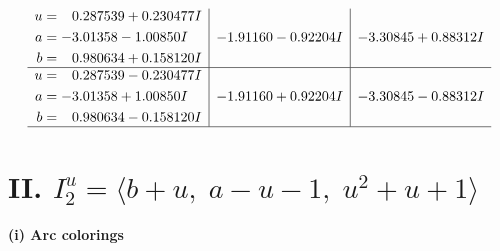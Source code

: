 \documentclass[1p]{elsarticle_modified}
\theoremstyle{definition}
\begin{document}
$$\begin{array}{c|c|c}
\begin{aligned}
u &= \phantom{-}0.287539 + 0.230477 I \\
a &= -3.01358 - 1.00850 I \\
b &= \phantom{-}0.980634 + 0.158120 I\end{aligned}
 & -1.91160 - 0.92204 I & -3.30845 + 0.88312 I \\ \hline\begin{aligned}
u &= \phantom{-}0.287539 - 0.230477 I \\
a &= -3.01358 + 1.00850 I \\
b &= \phantom{-}0.980634 - 0.158120 I\end{aligned}
 & -1.91160 + 0.92204 I & -3.30845 - 0.88312 I\\
 \hline 
 \end{array}$$\newpage\newpage\renewcommand{\arraystretch}{1}
\centering \section*{II. $I^u_{2}= \langle b+u,\;a- u-1,\;u^2+u+1 \rangle$}
\flushleft \textbf{(i) Arc colorings}\\
\end{document}
